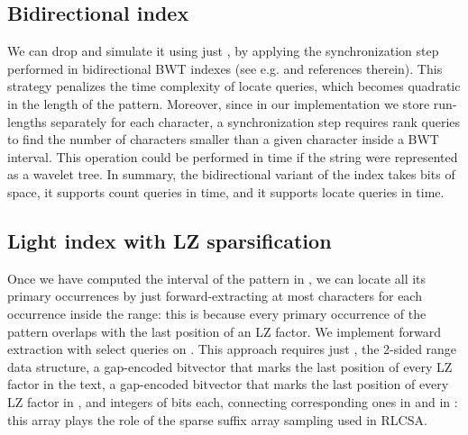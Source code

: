 \documentclass[a4paper,UKenglish]{lipics-v2016}
\begin{document}
\subsection{Bidirectional index}

We can drop  and simulate it using just , by applying the synchronization step performed in bidirectional BWT indexes (see e.g. \cite{belazzougui2014linear} and references therein). This strategy penalizes the time complexity of locate queries, which becomes quadratic in the length of the pattern. Moreover, since in our implementation we store run-lengths separately for each character, a synchronization step requires  rank queries to find the number of characters smaller than a given character inside a BWT interval. This operation could be performed in  time if the string were represented as a wavelet tree. In summary, the bidirectional variant of the index takes  bits of space, it supports count queries in  time, and it supports locate queries in  time. 












































\subsection{Light index with LZ sparsification}

Once we have computed the interval of the pattern in , we can locate all its primary occurrences by just forward-extracting at most  characters for each occurrence inside the range: this is because every primary occurrence of the pattern overlaps with the last position of an LZ factor. We implement forward extraction with select queries on . This approach requires just , the 2-sided range data structure, a gap-encoded bitvector  that marks the last position of every LZ factor in the text, a gap-encoded bitvector  that marks the last position of every LZ factor in , and  integers of  bits each, connecting corresponding ones in  and in : this array plays the role of the sparse suffix array sampling used in RLCSA. 
\end{document}
